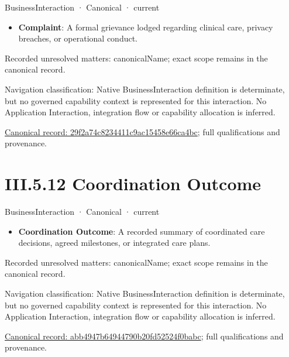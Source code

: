 \label{element:29f2a74c8234411c9ac15458e66ca4bc}
{\small BusinessInteraction · Canonical · current}\par

\begin{itemize}


\item \textbf{Complaint}: A formal grievance lodged regarding clinical care, privacy breaches, or operational conduct.

\end{itemize}

{\small Recorded unresolved matters: canonicalName; exact scope remains in the canonical record.}\par
{\small Navigation classification: Native BusinessInteraction definition is determinate, but no governed capability context is represented for this interaction. No Application Interaction, integration flow or capability allocation is inferred.}\par
{\footnotesize \href{../../../../../../../../continuum/business/business-interaction/29f2a74c8234411c9ac15458e66ca4bc.md}{Canonical record: 29f2a74c8234411c9ac15458e66ca4bc}; full qualifications and provenance.}\par
\section*{III.5.12 Coordination Outcome}
\label{navigation:III.5.12}

\label{element:abb4947b64944790b20fd52524f0babc}
{\small BusinessInteraction · Canonical · current}\par

\begin{itemize}


\item \textbf{Coordination Outcome}: A recorded summary of coordinated care decisions, agreed milestones, or integrated care plans.

\end{itemize}

{\small Recorded unresolved matters: canonicalName; exact scope remains in the canonical record.}\par
{\small Navigation classification: Native BusinessInteraction definition is determinate, but no governed capability context is represented for this interaction. No Application Interaction, integration flow or capability allocation is inferred.}\par
{\footnotesize \href{../../../../../../../../continuum/business/business-interaction/abb4947b64944790b20fd52524f0babc.md}{Canonical record: abb4947b64944790b20fd52524f0babc}; full qualifications and provenance.}\par
